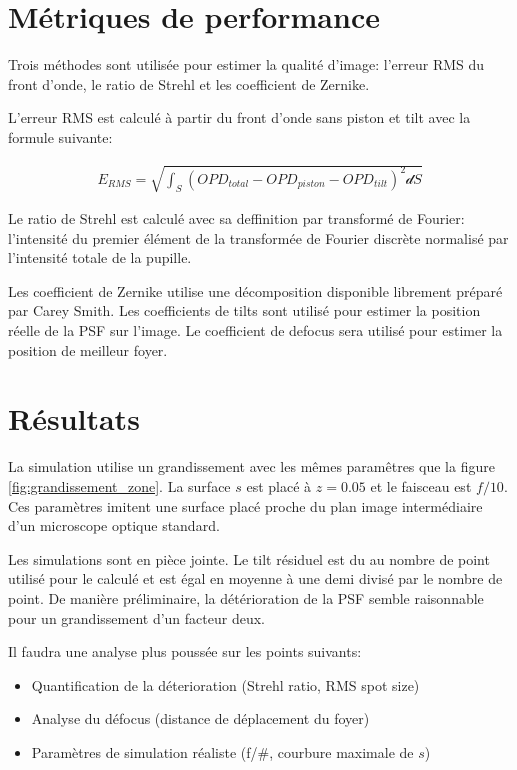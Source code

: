 \documentclass[a4paper,10pt]{article}
\numberwithin{equation}{section}
\numberwithin{figure}{section}
\numberwithin{table}{section}
\begin{document}
\section{Métriques de performance}

Trois méthodes sont utilisée pour estimer la qualité d'image: l'erreur RMS du front d'onde, le ratio de Strehl et les coefficient de Zernike.

L'erreur RMS est calculé à partir du front d'onde sans piston et tilt avec la formule suivante:

\begin{align}
	E_{RMS} = \sqrt{\int_S (OPD_{total} - OPD_{piston} - OPD_{tilt})^2 \mathcal{d}S}
\end{align}

Le ratio de Strehl est calculé avec sa deffinition par transformé de Fourier: l'intensité du premier élément de la transformée de Fourier discrète normalisé par l'intensité totale de la pupille.

Les coefficient de Zernike utilise une décomposition disponible librement préparé par Carey Smith. Les coefficients de tilts sont utilisé pour estimer la position réelle de la PSF sur l'image. Le coefficient de defocus sera utilisé pour estimer la position de meilleur foyer.

\section{Résultats}

La simulation utilise un grandissement avec les mêmes paramêtres que la figure \ref{fig:grandissement_zone}. La surface $s$ est placé à $z = 0.05$ et le faisceau est $f/10$. Ces paramètres imitent une surface placé proche du plan image intermédiaire d'un microscope optique standard.

Les simulations sont en pièce jointe. Le tilt résiduel est du au nombre de point utilisé pour le calculé et est égal en moyenne à une demi divisé par le nombre de point. De manière préliminaire, la détérioration de la PSF semble raisonnable pour un grandissement d'un facteur deux.

Il faudra une analyse plus poussée sur les points suivants:
\begin{itemize}
	\item Quantification de la déterioration (Strehl ratio, RMS spot size)
	\item Analyse du défocus (distance de déplacement du foyer)
	\item Paramètres de simulation réaliste (f/\#, courbure maximale de $s$)
\end{itemize}
\end{document}
